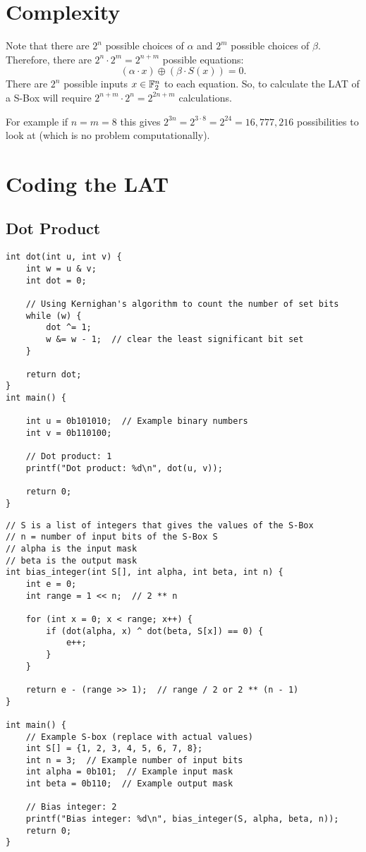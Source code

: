 \section{Complexity}
Note that there are $2^n$ possible choices of $\alpha$ and $2^m$ possible choices of $\beta$. Therefore, there are $2^n\cdot 2^m=2^{n+m}$ possible equations: \[
(\alpha\cdot x)\oplus(\beta\cdot S(x))=0.
\] There are $2^n$ possible inputs $x\in\mathbb{F}_2^n$ to each equation. So, to calculate the LAT of a S-Box will require $2^{n+m}\cdot 2^n=2^{2n+m}$ calculations.

For example if $n=m=8$ this gives $2^{3n}=2^{3\cdot 8}=2^{24}=16,777,216$ possibilities to look at (which is no problem computationally).

\section{Coding the LAT}
\subsection{Dot Product}
\begin{lstlisting}[style=C]
int dot(int u, int v) {
	int w = u & v;
	int dot = 0;
	
	// Using Kernighan's algorithm to count the number of set bits
	while (w) {
		dot ^= 1;
		w &= w - 1;  // clear the least significant bit set
	}
	
	return dot;
}
int main() {
	
	int u = 0b101010;  // Example binary numbers
	int v = 0b110100;
	
	// Dot product: 1
	printf("Dot product: %d\n", dot(u, v));
	
	return 0;
}
\end{lstlisting}

\newpage
\begin{lstlisting}[style=C]
// S is a list of integers that gives the values of the S-Box
// n = number of input bits of the S-Box S
// alpha is the input mask
// beta is the output mask
int bias_integer(int S[], int alpha, int beta, int n) {
	int e = 0;
	int range = 1 << n;  // 2 ** n
	
	for (int x = 0; x < range; x++) {
		if (dot(alpha, x) ^ dot(beta, S[x]) == 0) {
			e++;
		}
	}
	
	return e - (range >> 1);  // range / 2 or 2 ** (n - 1)
}

int main() {
	// Example S-box (replace with actual values)
	int S[] = {1, 2, 3, 4, 5, 6, 7, 8};  
	int n = 3;  // Example number of input bits
	int alpha = 0b101;  // Example input mask
	int beta = 0b110;  // Example output mask
	
	// Bias integer: 2
	printf("Bias integer: %d\n", bias_integer(S, alpha, beta, n));
	return 0;
}
\end{lstlisting}

